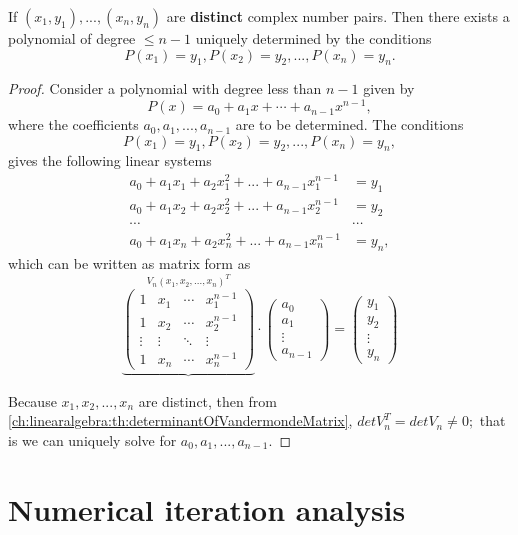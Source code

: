 \begin{refsection}
\begin{lemma}
If $(x_1,y_1),...,(x_n,y_n)$ are \textbf{distinct} complex number pairs. Then there exists a polynomial of degree $\leq n-1$ uniquely determined by the conditions
$$P(x_1)=y_1, P(x_2) = y_2,...,P(x_n) = y_n.$$ 	
\end{lemma}
\begin{proof}
Consider a polynomial with degree less than $n-1$ given by
$$P(x) = a_0 +a_1x + \cdots + a_{n-1} x^{n-1},$$
where the coefficients $a_0,a_1,...,a_{n-1}$ are to be determined. The conditions
$$P(x_1)=y_1, P(x_2) = y_2,...,P(x_n) = y_n,$$ 
gives the following linear systems
\begin{align*}
a_0 + a_1x_1 + a_2x_1^2 + ... + a_{n-1}x_{1}^{n-1} &= y_1\\
a_0 + a_1x_2 + a_2x_2^2 + ... + a_{n-1}x_{2}^{n-1} &= y_2\\
\cdots & \cdots \\
a_0 + a_1x_n + a_2x_n^2 + ... + a_{n-1}x_{n}^{n-1} &= y_n,
\end{align*}
which can be written as matrix form as
$$\underbrace{\begin{pmatrix}
1 & x_1 & \cdots & x_1^{n-1}\\ 
1 & x_2 & \cdots & x_2^{n-1}\\ 
\vdots  & \vdots & \ddots & \vdots\\ 
1 & x_n & \cdots & x_n^{n-1}
\end{pmatrix}}^{V_n(x_1,x_2,...,x_n)^T} \cdot \begin{pmatrix}
a_0\\
a_1\\
\vdots\\
a_{n-1}
\end{pmatrix} = \begin{pmatrix}
y_1\\
y_2\\
\vdots\\
y_n
\end{pmatrix}$$

Because $x_1,x_2,...,x_n$ are distinct, then from \autoref{ch:linearalgebra:th:determinantOfVandermondeMatrix}, $det V_n^T = det V_n \neq 0;$ that is we can uniquely solve for $a_0,a_1,...,a_{n-1}$.
\end{proof}


\section{Numerical iteration analysis}

\end{refsection}

